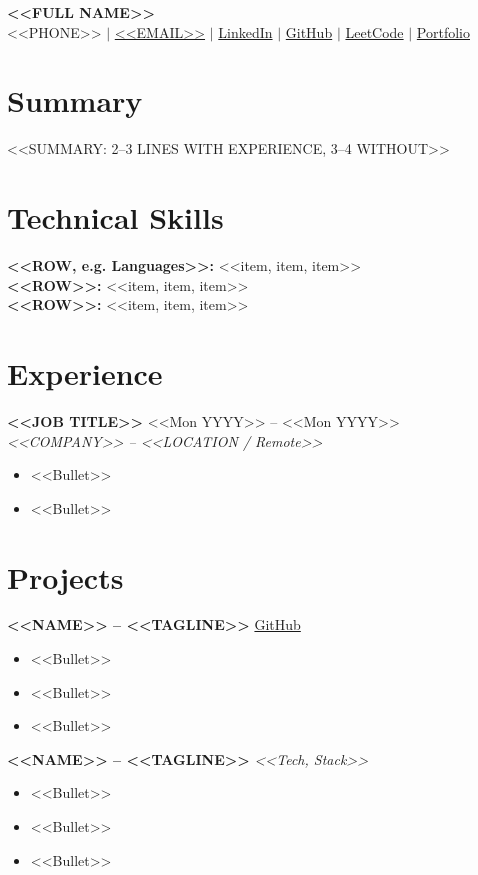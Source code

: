 \documentclass[10pt,a4paper]{article}
\begin{document}
\color{darktext}

\begin{center}
    {\Huge \textbf{<<FULL NAME>>}} \\[4pt]
    \small
    <<PHONE>> \quad $\vert$ \quad \href{mailto:<<EMAIL>>}{<<EMAIL>>} \quad $\vert$ \quad
    \href{<<LINKEDIN URL>>}{LinkedIn} \quad $\vert$ \quad
    \href{<<GITHUB URL>>}{GitHub} \quad $\vert$ \quad
    \href{<<LEETCODE URL>>}{LeetCode} \quad $\vert$ \quad
    \href{<<PORTFOLIO URL>>}{Portfolio}
\end{center}

\section*{Summary}
<<SUMMARY: 2--3 LINES WITH EXPERIENCE, 3--4 WITHOUT>>

\section*{Technical Skills}
\textbf{<<ROW, e.g. Languages>>:} <<item, item, item>> \\
\textbf{<<ROW>>:} <<item, item, item>> \\
\textbf{<<ROW>>:} <<item, item, item>>

\section*{Experience}
\textbf{<<JOB TITLE>>} \hfill <<Mon YYYY>> -- <<Mon YYYY>> \\
\textit{<<COMPANY>> -- <<LOCATION / Remote>>}
\begin{itemize}
    \item <<Bullet>>
    \item <<Bullet>>
\end{itemize}

\section*{Projects}
\textbf{<<NAME>> -- <<TAGLINE>>} \hfill \href{<<URL>>}{GitHub}
\begin{itemize}
    \item <<Bullet>>
    \item <<Bullet>>
    \item <<Bullet>>
\end{itemize}

\textbf{<<NAME>> -- <<TAGLINE>>} \hfill \textit{<<Tech, Stack>>}
\begin{itemize}
    \item <<Bullet>>
    \item <<Bullet>>
    \item <<Bullet>>
\end{itemize}
\end{document}
